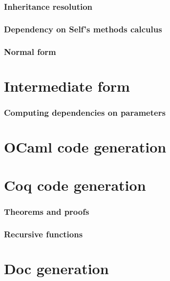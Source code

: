 \documentclass{book}
\begin{document}
\subsection{Inheritance resolution}
\subsection{Dependency on Self's methods calculus}
\subsection{Normal form}

\chapter{Intermediate form}
\subsection{Computing dependencies on parameters}

\chapter{OCaml code generation}

\chapter{Coq code generation}
\subsection{Theorems and proofs}
\subsection{Recursive functions}

\chapter{Doc generation}
\end{document}
